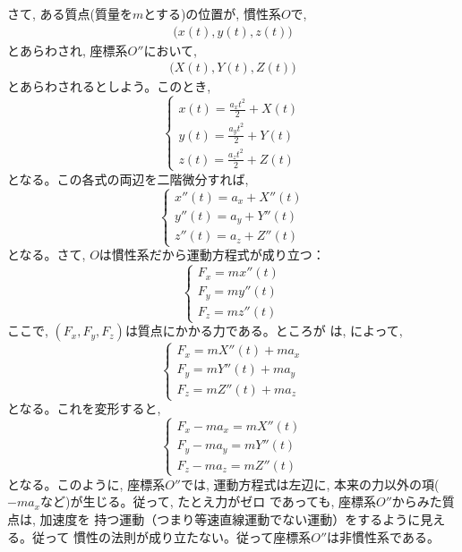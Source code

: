 さて, ある質点(質量を$m$とする)の位置が, 慣性系$O$で, 
\begin{eqnarray}\bigl(x(t), y(t), z(t)\bigr)\end{eqnarray}
とあらわされ, 座標系$O''$において, 
\begin{eqnarray}\bigl(X(t), Y(t), Z(t)\bigr)\end{eqnarray}
とあらわされるとしよう。このとき, 
\begin{equation}\begin{cases}
x(t)=\frac{a_xt^2}{2}+X(t)\\[6pt]
y(t)=\frac{a_yt^2}{2}+Y(t)\\[6pt]
z(t)=\frac{a_zt^2}{2}+Z(t)
\end{cases}\label{eq:origin_move_acc4}\end{equation}
となる。この各式の両辺を二階微分すれば, 
\begin{equation}\begin{cases}
x''(t)=a_x+X''(t)\\
y''(t)=a_y+Y''(t)\\
z''(t)=a_z+Z''(t)
\end{cases}\label{eq:origin_move_acc5}\end{equation}
となる。さて, $O$は慣性系だから運動方程式が成り立つ：
\begin{equation}\begin{cases}
F_x=mx''(t)\\
F_y=my''(t)\\
F_z=mz''(t)
\end{cases}\label{eq:origin_move_acc6}\end{equation}
ここで, $(F_x, F_y, F_z)$は質点にかかる力である。ところが
は, によって, 
\begin{equation}\begin{cases}
F_x=mX''(t)+ma_x\\
F_y=mY''(t)+ma_y\\
F_z=mZ''(t)+ma_z
\end{cases}\label{eq:origin_move_acc7}\end{equation}
となる。これを変形すると, 
\begin{equation}\begin{cases}
F_x-ma_x=mX''(t)\\
F_y-ma_y=mY''(t)\\
F_z-ma_z=mZ''(t)\label{eq:noninertialframe5}
\end{cases}\end{equation}
となる。このように, 座標系$O''$では, 運動方程式は左辺に, 
本来の力以外の項($-ma_x$など)が生じる。従って, たとえ力がゼロ
であっても, 座標系$O''$からみた質点は, 加速度を
持つ運動（つまり等速直線運動でない運動）をするように見える。従って
慣性の法則が成り立たない。従って座標系$O''$は非慣性系である。\mv

